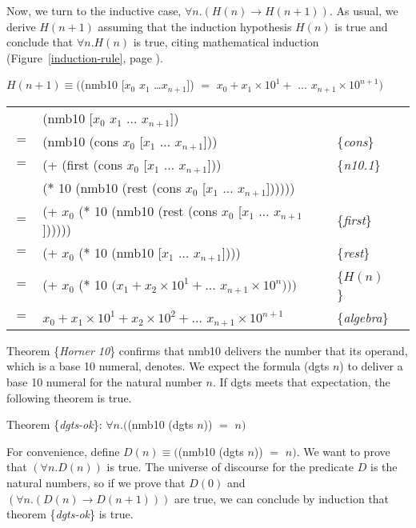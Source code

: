 Now, we turn to the inductive case, $\forall n. (H(n) \rightarrow H(n+1))$.
As usual, we derive $H(n+1)$ assuming that the induction hypothesis $H(n)$ is true
and conclude that $\forall n.H(n)$ is true,
citing mathematical induction
(Figure~\ref{induction-rule}, page \pageref{induction-rule}).

\begin{center}
$H(n+1) \equiv ($\textsf{(nmb10 [$x_0$ $x_1$ \dots $x_{n+1}$])} $=$
$x_0 + x_1 \times 10^1 +$  $\dots$ $x_{n+1} \times 10^{n+1})$ \\
\begin{tabular}{rlll}
\hline
    & \textsf{(nmb10 [$x_0$ $x_1$ $\dots$ $x_{n+1}$])}           & &\\
$=$ & \textsf{(nmb10 (cons $x_0$ [$x_1$ $\dots$ $x_{n+1}$]))}    & \{\emph{cons}\}&\\
$=$ & \textsf{(+ (first (cons $x_0$ [$x_1$ $\dots$ $x_{n+1}$]))}  & \{\emph{n10.1}\} &\\
    & \phantom{\textsf{(+ }}\textsf{($*$ 10 (nmb10 (rest (cons $x_0$ [$x_1$ $\dots$ $x_{n+1}$])))))} &&\\
$=$ & \textsf{(+ $x_0$ ($*$ 10 (nmb10 (rest (cons $x_0$ [$x_1$ $\dots$ $x_{n+1}$])))))}      & \{\emph{first}\} &\\
$=$ & \textsf{(+ $x_0$ ($*$ 10 (nmb10 [$x_1$ $\dots$ $x_{n+1}$])))}                          & \{\emph{rest}\}&\\
$=$ & (+ $x_0$ ($*$ 10 $(x_1 + x_2 \times 10^1 + \dots$ $x_{n+1} \times 10^{n})))$  & \{$H(n)$\}&\\
$=$ & $x_0 + x_1 \times 10^1 + x_2 \times 10^2 + \dots$ $x_{n+1} \times 10^{n+1}$   & \{\emph{algebra}\} &\\
\end{tabular}
\end{center}

Theorem \{\emph{Horner 10}\} confirms that \textsf{nmb10} delivers the
number that its operand, which is a base 10 numeral, denotes.
We expect the formula \textsf{(dgts $n$)} to deliver a base 10 numeral
for the natural number $n$. If \textsf{dgts} meets that expectation,
the following theorem is true.

\begin{center}
\label{dgts-ok}
Theorem \{\emph{dgts-ok}\}:
$\forall n.($\textsf{(nmb10 (dgts $n$))} $=$ $n)$
\end{center}

For convenience, define $D(n) \equiv ($\textsf{(nmb10 (dgts $n$))} $=$ $n)$.
We want to prove that $(\forall n.D(n))$ is true.
The universe of discourse
for the predicate $D$ is the natural numbers,
so if we prove that $D(0)$ and
$(\forall n.(D(n) \rightarrow D(n+1)))$
are true, we can conclude by induction
that theorem \{\emph{dgts-ok}\} is true.

